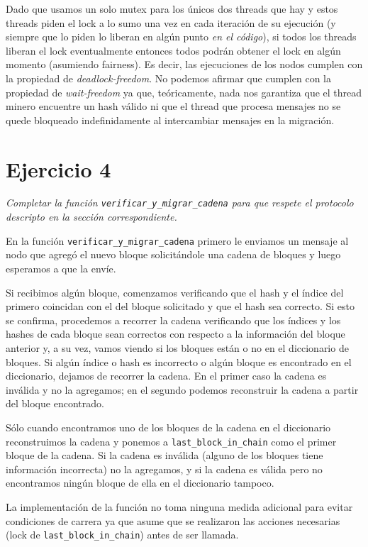 Dado que usamos un solo mutex para los únicos dos threads que hay y estos threads piden el lock a lo sumo una vez en cada iteración de su ejecución (y siempre que lo piden lo liberan en algún punto \emph{en el código}), si todos los threads liberan el lock eventualmente entonces todos podrán obtener el lock en algún momento (asumiendo fairness). Es decir, las ejecuciones de los nodos cumplen con la propiedad de \emph{deadlock-freedom}. No podemos afirmar que cumplen con la propiedad de \emph{wait-freedom} ya que, teóricamente, nada nos garantiza que el thread minero encuentre un hash válido ni que el thread que procesa mensajes no se quede bloqueado indefinidamente al intercambiar mensajes en la migración.


\section{Ejercicio 4}

\emph{Completar la función \texttt{verificar\_y\_migrar\_cadena} para que respete el protocolo descripto en la sección correspondiente.}

En la función \texttt{verificar\_y\_migrar\_cadena} primero le enviamos un mensaje al nodo que agregó el nuevo bloque solicitándole una cadena de bloques y luego esperamos a que la envíe.

Si recibimos algún bloque, comenzamos verificando que el hash y el índice del primero coincidan con el del bloque solicitado y que el hash sea correcto. Si esto se confirma, procedemos a recorrer la cadena verificando que los índices y los hashes de cada bloque sean correctos con respecto a la información del bloque anterior y, a su vez, vamos viendo si los bloques están o no en el diccionario de bloques. Si algún índice o hash es incorrecto o algún bloque es encontrado en el diccionario, dejamos de recorrer la cadena. En el primer caso la cadena es inválida y no la agregamos; en el segundo podemos reconstruir la cadena a partir del bloque encontrado.

Sólo cuando encontramos uno de los bloques de la cadena en el diccionario  reconstruimos la cadena y ponemos a \texttt{last\_block\_in\_chain} como el primer bloque de la cadena. Si la cadena es inválida (alguno de los bloques tiene información incorrecta) no la agregamos, y si la cadena es válida pero no encontramos ningún bloque de ella en el diccionario tampoco.

La implementación de la función no toma ninguna medida adicional para evitar condiciones de carrera ya que asume que se realizaron las acciones necesarias (lock de \texttt{last\_block\_in\_chain}) antes de ser llamada.


